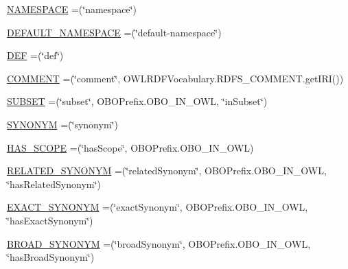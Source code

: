 \begin{DoxyCompactItemize}
\item 
\hyperlink{enumorg_1_1coode_1_1owlapi_1_1obo_1_1parser_1_1_o_b_o_vocabulary_a7a071668aa0e476275bc39455e5adaec}{N\-A\-M\-E\-S\-P\-A\-C\-E} =(\char`\"{}namespace\char`\"{})
\item 
\hyperlink{enumorg_1_1coode_1_1owlapi_1_1obo_1_1parser_1_1_o_b_o_vocabulary_a0d44f79f05f4f829a44d412851d1d5e8}{D\-E\-F\-A\-U\-L\-T\-\_\-\-N\-A\-M\-E\-S\-P\-A\-C\-E} =(\char`\"{}default-\/namespace\char`\"{})
\item 
\hyperlink{enumorg_1_1coode_1_1owlapi_1_1obo_1_1parser_1_1_o_b_o_vocabulary_a76e8d8a697203d10ccd41520ce9a0b6e}{D\-E\-F} =(\char`\"{}def\char`\"{})
\item 
\hyperlink{enumorg_1_1coode_1_1owlapi_1_1obo_1_1parser_1_1_o_b_o_vocabulary_ad59fce68a9e8ab8d19ab18fee43c832b}{C\-O\-M\-M\-E\-N\-T} =(\char`\"{}comment\char`\"{}, O\-W\-L\-R\-D\-F\-Vocabulary.\-R\-D\-F\-S\-\_\-\-C\-O\-M\-M\-E\-N\-T.\-get\-I\-R\-I())
\item 
\hyperlink{enumorg_1_1coode_1_1owlapi_1_1obo_1_1parser_1_1_o_b_o_vocabulary_a54b6dbca67b1bfe181352a28f4aa2024}{S\-U\-B\-S\-E\-T} =(\char`\"{}subset\char`\"{}, O\-B\-O\-Prefix.\-O\-B\-O\-\_\-\-I\-N\-\_\-\-O\-W\-L, \char`\"{}in\-Subset\char`\"{})
\item 
\hyperlink{enumorg_1_1coode_1_1owlapi_1_1obo_1_1parser_1_1_o_b_o_vocabulary_a052fb57399f58df4c1d4809a5c464046}{S\-Y\-N\-O\-N\-Y\-M} =(\char`\"{}synonym\char`\"{})
\item 
\hyperlink{enumorg_1_1coode_1_1owlapi_1_1obo_1_1parser_1_1_o_b_o_vocabulary_ad08c659b455ba328693cd2a22ce084e0}{H\-A\-S\-\_\-\-S\-C\-O\-P\-E} =(\char`\"{}has\-Scope\char`\"{}, O\-B\-O\-Prefix.\-O\-B\-O\-\_\-\-I\-N\-\_\-\-O\-W\-L)
\item 
\hyperlink{enumorg_1_1coode_1_1owlapi_1_1obo_1_1parser_1_1_o_b_o_vocabulary_ad9e853612dbc5f9b4769b46c3e6312b2}{R\-E\-L\-A\-T\-E\-D\-\_\-\-S\-Y\-N\-O\-N\-Y\-M} =(\char`\"{}related\-Synonym\char`\"{}, O\-B\-O\-Prefix.\-O\-B\-O\-\_\-\-I\-N\-\_\-\-O\-W\-L, \char`\"{}has\-Related\-Synonym\char`\"{})
\item 
\hyperlink{enumorg_1_1coode_1_1owlapi_1_1obo_1_1parser_1_1_o_b_o_vocabulary_aee7c9ecf19af5ab2b34eedc4efaea1e7}{E\-X\-A\-C\-T\-\_\-\-S\-Y\-N\-O\-N\-Y\-M} =(\char`\"{}exact\-Synonym\char`\"{}, O\-B\-O\-Prefix.\-O\-B\-O\-\_\-\-I\-N\-\_\-\-O\-W\-L, \char`\"{}has\-Exact\-Synonym\char`\"{})
\item 
\hyperlink{enumorg_1_1coode_1_1owlapi_1_1obo_1_1parser_1_1_o_b_o_vocabulary_a9f0a01193892fc49c006511c5d2b476f}{B\-R\-O\-A\-D\-\_\-\-S\-Y\-N\-O\-N\-Y\-M} =(\char`\"{}broad\-Synonym\char`\"{}, O\-B\-O\-Prefix.\-O\-B\-O\-\_\-\-I\-N\-\_\-\-O\-W\-L, \char`\"{}has\-Broad\-Synonym\char`\"{})

\end{DoxyCompactItemize}
